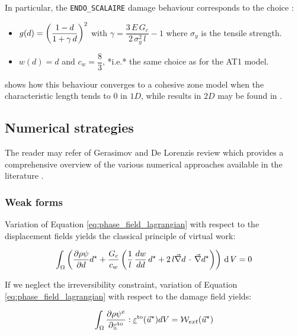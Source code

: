 In particular, the \texttt{ENDO\_SCALAIRE} damage behaviour corresponds
to the choice \cite{edf_loi_2011}:

\begin{itemize}
    \item \(g(d)=\left(\dfrac{1-d}{1+\gamma\,d}\right)^{2}\) with
    \(\gamma=\dfrac{3\,E\,G_{c}}{2\,\sigma_{y}^{2}\,l}-1\) where
    \(\sigma_{y}\) is the tensile strength.
    \item \(w(d) = d\) and \(c_w=\dfrac{8}{3}\), *i.e.* the same choice as for
    the AT1 model.
\end{itemize}

\cite{lorentz_convergence_2011} shows how this behaviour converges to a
cohesive zone model when the characteristic length tends to \(0\) in
\(1D\), while results in \(2D\) may be found in
\cite{cuvilliez_transition_2011}.

\subsection{Numerical strategies}

The reader may refer of Gerasimov and De Lorenzis review which provides
a comprehensive overview of the various numerical approaches available
in the literature \cite{gerasimov_numerical_2020}.

\subsubsection{Weak forms}

Variation of Equation \eqref{eq:phase_field_lagrangian} with respect to the
displacement fields yields the classical principle of virtual work:

\begin{equation}
    \label{eq:phase_field:d}
    \int_\Omega \left(\displaystyle \frac{\displaystyle \partial \rho\psi}{\displaystyle \partial d} d^{\star}+\dfrac{G_c}{c_w}\left(\dfrac{1}{l}\,\displaystyle \frac{\displaystyle dw}{\displaystyle dd}\,d^{\star} + 2\,l \vec{\nabla} d\, \cdot\, \vec{\nabla} d^{\star}\right)\right) \,\mathrm{d}\,V = 0
\end{equation}

If we neglect the irreversibility constraint, variation of Equation
\eqref{eq:phase_field_lagrangian} with respect to the damage field yields:

\begin{equation}
    \label{eq:phase_field:pvw}
        \begin{aligned}
            \int_{\Omega} \frac{\partial \rho \psi^{e}}{\partial \underline{\varepsilon}^{\mathrm{to}}} : \underline{\varepsilon}^{\mathrm{to}} (\vec{u}^{\star}) dV = \mathcal{W}_{ext}(\vec{u}^{\star})
        \end{aligned}
\end{equation}

